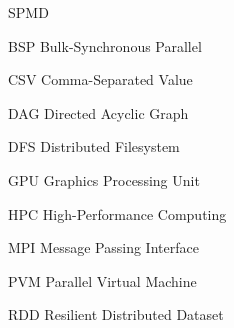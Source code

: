 \begin{listofabbrv}{SPMD}
	\item[BSP] Bulk-Synchronous Parallel
	\item[CSV] Comma-Separated Value
        \item[DAG] Directed Acyclic Graph
        \item[DFS] Distributed Filesystem
        \item[GPU] Graphics Processing Unit
        \item[HPC] High-Performance Computing
        \item[MPI] Message Passing Interface
        \item[PVM] Parallel Virtual Machine
        \item[RDD] Resilient Distributed Dataset
\end{listofabbrv}


\listoffigures

\listoftables

\tableofcontents